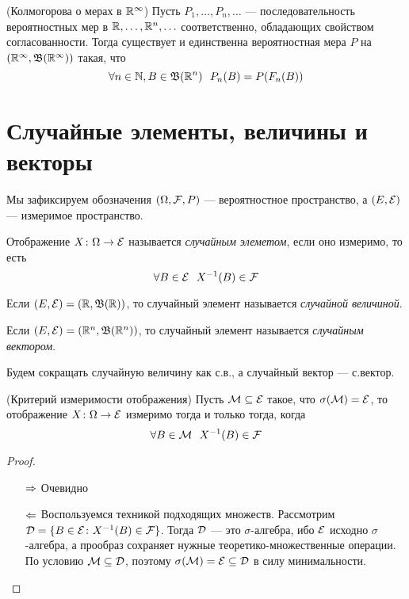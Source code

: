 \begin{theorem} (Колмогорова о мерах в $\mathbb{R}^\infty$)
	Пусть $P_1, \ldots, P_n, \ldots$ --- последовательность вероятностных мер в $\mathbb{R}, \ldots, \mathbb{R}^n, \ldots$ соответственно, обладающих свойством согласованности. Тогда существует и единственна вероятностная мера $P$ на $(\mathbb{R}^\infty, \mathfrak{B}(\mathbb{R}^\infty))$ такая, что
	\[
		\forall n \in \N, B \in \B(\R^n)\ \ P_n(B) = P(F_n(B))
	\]
\end{theorem}

\section{Случайные элементы, величины и векторы}

\begin{note}
	Мы зафиксируем обозначения $(\Omega, \mathcal{F}, P)$ --- вероятностное пространство, а $(E, \mathcal{E})$ --- измеримое пространство.
\end{note}

\begin{definition}
	Отображение $X \colon \Omega \to \mathcal{E}$ называется \textit{случайным элеметом}, если оно измеримо, то есть
	\[
		\forall B \in \mathcal{E}\ \ X^{-1}(B) \in \mathcal{F}
	\]
\end{definition}

\begin{definition}
	Если $(E, \mathcal{E}) = (\mathbb{R}, \mathfrak{B}(\mathbb{R}))$, то случайный элемент называется \textit{случайной величиной}.
\end{definition}

\begin{definition}
	Если $(E, \mathcal{E}) = (\mathbb{R}^n, \mathfrak{B}(\mathbb{R}^n))$, то случайный элемент называется \textit{случайным вектором}.
\end{definition}

\begin{note}
	Будем сокращать случайную величину как с.в., а случайный вектор --- с.вектор.
\end{note}

\begin{lemma} (Критерий измеримости отображения)
	Пусть $\mathcal{M} \subseteq \mathcal{E}$ такое, что $\sigma(\mathcal{M}) = \mathcal{E}$, то отображение $X \colon \Omega \to \mathcal{E}$ измеримо тогда и только тогда, когда
	\[
		\forall B \in \cM\ \ X^{-1}(B) \in \F
	\]
\end{lemma}

\begin{proof}~
	\begin{itemize}
		\item[$\Rightarrow$] Очевидно
		
		\item[$\Leftarrow$] Воспользуемся техникой подходящих множеств. Рассмотрим $\mathcal{D} = \{B \in \mathcal{E} \colon X^{-1}(B) \in \mathcal{F}\}$. Тогда $\mathcal{D}$ --- это $\sigma$-алгебра, ибо $\mathcal{E}$ исходно $\sigma$-алгебра, а прообраз сохраняет нужные теоретико-множественные операции. По условию $\mathcal{M} \subseteq \mathcal{D}$, поэтому $\sigma(\mathcal{M}) = \mathcal{E} \subseteq \mathcal{D}$ в силу минимальности.
	\end{itemize}
\end{proof}

